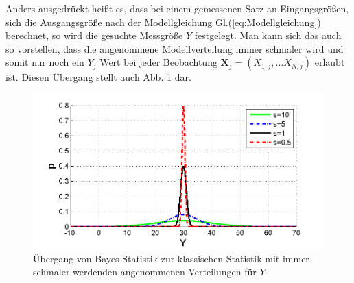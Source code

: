 Anders ausgedrückt heißt es, dass bei einem gemessenen Satz an Eingangsgrößen,
sich die Ausgangsgröße nach der Modellgleichung Gl.(\ref{eq:Modellgleichung}) berechnet,
so wird die gesuchte Messgröße $Y$ festgelegt. Man kann sich das auch so vorstellen, dass
die angenommene Modellverteilung immer schmaler wird und somit nur
noch ein $Y_j$ Wert bei jeder Beobachtung $\boldsymbol{X}_j = (X_{1,j}, \dots X_{N,j})$
erlaubt ist.
Diesen Übergang stellt auch Abb. \ref*{fig:Uebergang_Delta_Funktion} dar.
\begin{figure}[!htp]
	\begin{center}
		\includegraphics[width=130mm]{11_vorlesung_GUMS1/media/DeltaPeaken.png}
		\caption{Übergang von Bayes-Statistik zur klassischen Statistik mit immer schmaler werdenden angenommenen Verteilungen für $Y$}
		\label{fig:Uebergang_Delta_Funktion}
	\end{center}
\end{figure}

